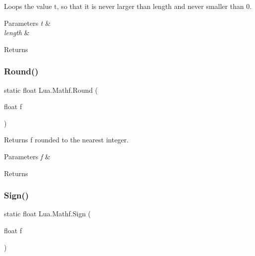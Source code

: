 Loops the value t, so that it is never larger than length and never smaller than 0. 


\begin{DoxyParams}{Parameters}
{\em t} & \\
\hline
{\em length} & \\
\hline
\end{DoxyParams}
\begin{DoxyReturn}{Returns}

\end{DoxyReturn}
\mbox{\label{class_lua_1_1_mathf_a9f6511ccc1da8fd5228959f67b995d91}} 
\subsubsection{\texorpdfstring{Round()}{Round()}}
{\footnotesize\ttfamily static float Lua.\+Mathf.\+Round (\begin{DoxyParamCaption}\item[{float}]{f }\end{DoxyParamCaption})\hspace{0.3cm}{\ttfamily [static]}}



Returns f rounded to the nearest integer. 


\begin{DoxyParams}{Parameters}
{\em f} & \\
\hline
\end{DoxyParams}
\begin{DoxyReturn}{Returns}

\end{DoxyReturn}
\mbox{\label{class_lua_1_1_mathf_ae5d3654f321079c30baaf42bdf226d89}} 
\subsubsection{\texorpdfstring{Sign()}{Sign()}}
{\footnotesize\ttfamily static float Lua.\+Mathf.\+Sign (\begin{DoxyParamCaption}\item[{float}]{f }\end{DoxyParamCaption})\hspace{0.3cm}{\ttfamily [static]}}



